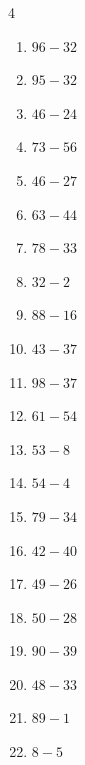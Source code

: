 \begin{multicols}{4}
\begin{enumerate}
\columnbreak %

  \item $96-32$
        \phantom{$=64$}

  \item $95-32$
        \phantom{$=63$}

  \item $46-24$
        \phantom{$=22$}

  \item $73-56$
        \phantom{$=17$}

  \item $46-27$
        \phantom{$=19$}

  \item $63-44$
        \phantom{$=19$}

  \item $78-33$
        \phantom{$=45$}

  \item $32-2$
        \phantom{$=30$}

  \item $88-16$
        \phantom{$=72$}

  \item $43-37$
        \phantom{$=6$}

  \item $98-37$
        \phantom{$=61$}

  \item $61-54$
        \phantom{$=7$}

  \item $53-8$
        \phantom{$=45$}

  \item $54-4$
        \phantom{$=50$}

  \item $79-34$
        \phantom{$=45$}

  \item $42-40$
        \phantom{$=2$}

  \item $49-26$
        \phantom{$=23$}

  \item $50-28$
        \phantom{$=22$}

  \item $90-39$
        \phantom{$=51$}

  \item $48-33$
        \phantom{$=15$}

  \item $89-1$
        \phantom{$=88$}

  \item $8-5$
        \phantom{$=3$}


\end{enumerate}
\end{multicols}
